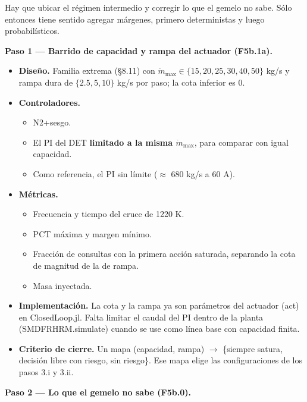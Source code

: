 \documentclass[11pt,a4paper]{article}
\newcommand{\codeus}{\textunderscore\allowbreak}
\newcommand{\code}[1]{{\small\ttfamily\let\_\codeus #1}}
\begin{document}
Hay que ubicar el régimen intermedio y corregir lo que el gemelo no sabe. Sólo entonces tiene sentido agregar márgenes, primero deterministas y luego probabilísticos.

\textbf{Paso 1 — Barrido de capacidad y rampa del actuador (F5b.1a).}

\begin{itemize}
\item \textbf{Diseño.} Familia extrema (\S{}8.11) con $\dot m_{\max}\in\{15,20,25,30,40,50\}$ kg/s y rampa dura de $\{2.5, 5, 10\}$ kg/s por paso; la cota inferior es 0.
\item \textbf{Controladores.}
\begin{itemize}
\item N2+sesgo.
\item El PI del DET \textbf{limitado a la misma $\dot m_{\max}$}, para comparar con igual capacidad.
\item Como referencia, el PI sin límite ($\approx$ 680 kg/s a 60 A).
\end{itemize}
\item \textbf{Métricas.}
\begin{itemize}
\item Frecuencia y tiempo del cruce de 1220 K.
\item PCT máxima y margen mínimo.
\item Fracción de consultas con la primera acción saturada, separando la cota de magnitud de la de rampa.
\item Masa inyectada.
\end{itemize}
\item \textbf{Implementación.} La cota y la rampa ya son parámetros del actuador (\code{act}) en \code{ClosedLoop.jl}. Falta limitar el caudal del PI dentro de la planta (\code{SMDFRHRM.simulate}) cuando se use como línea base con capacidad finita.
\item \textbf{Criterio de cierre.} Un mapa (capacidad, rampa) $\to$ \{siempre satura, decisión libre con riesgo, sin riesgo\}. Ese mapa elige las configuraciones de los pasos 3.i y 3.ii.
\end{itemize}

\textbf{Paso 2 — Lo que el gemelo no sabe (F5b.0).}
\end{document}
